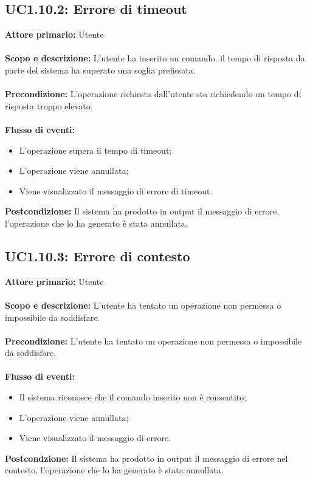 \documentclass{scalatekids-article}
\begin{document}
\subsection{UC1.10.2: Errore di timeout}
\textbf{Attore primario:} Utente \\ \\
\textbf{Scopo e descrizione:} L'utente ha inserito un comando, il tempo di risposta da parte del sistema ha superato una soglia prefissata.\\ \\
\textbf{Precondizione:} L'operazione richiesta dall'utente sta richiedendo un tempo di risposta troppo elevato.\\ \\
\textbf{Flusso di eventi:}
\begin{itemize}
\item L'operazione supera il tempo di timeout;
\item L'operazione viene annullata;
\item Viene visualizzato il messaggio di errore di timeout.
\end{itemize}
\textbf{Postcondizione:} Il sistema ha prodotto in output il messaggio di errore, l'operazione che lo ha generato è stata annullata.
\subsection{UC1.10.3: Errore di contesto}
\textbf{Attore primario:} Utente \\ \\
\textbf{Scopo e descrizione:} L'utente ha tentato un operazione non permessa o impossibile da soddisfare.\\ \\
\textbf{Precondizione:} L'utente ha tentato un operazione non permessa o impossibile da soddisfare.\\ \\
\textbf{Flusso di eventi:}
\begin{itemize}
\item Il sistema riconosce che il comando inserito non è consentito;
\item L'operazione viene annullata;
\item Viene visualizzato il messaggio di errore.
\end{itemize}
\textbf{Postcondzione:} Il sistema ha prodotto in output il messaggio di errore nel contesto, l'operazione che lo ha generato è stata annullata.
\end{document}
